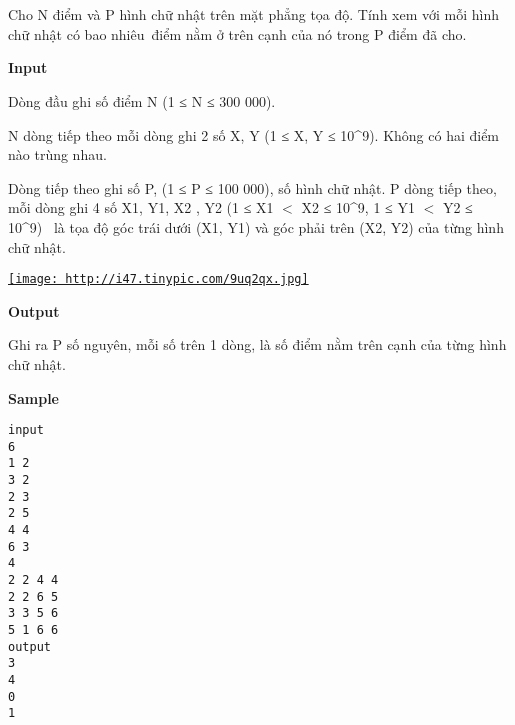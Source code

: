 

 

 

Cho N điểm và P hình chữ nhật trên mặt phẳng tọa độ. Tính xem với mỗi hình chữ nhật có bao nhiêu điểm nằm ở trên cạnh của nó trong P điểm đã cho.

\textbf{Input}

Dòng đầu ghi số điểm N (1 ≤ N ≤ 300 000).

N dòng tiếp theo mỗi dòng ghi 2 số X, Y (1 ≤ X, Y ≤ 10\textasciicircum9). Không có hai điểm nào trùng nhau.

Dòng tiếp theo ghi số P, (1 ≤ P ≤ 100 000), số hình chữ nhật. P dòng tiếp theo, mỗi dòng ghi 4 số X1, Y1, X2 , Y2 (1 ≤ X1 $<$ X2 ≤ 10\textasciicircum9, 1 ≤ Y1 $<$ Y2 ≤ 10\textasciicircum9)  là tọa độ góc trái dưới (X1, Y1) và góc phải trên (X2, Y2) của từng hình chữ nhật.

\href{http://tinypic.com}{
\texttt{[image: http://i47.tinypic.com/9uq2qx.jpg]}}

\textbf{Output}

Ghi ra P số nguyên, mỗi số trên 1 dòng, là số điểm nằm trên cạnh của từng hình chữ nhật.

\textbf{Sample}
\begin{verbatim}
input  
6 
1 2 
3 2 
2 3 
2 5 
4 4 
6 3 
4 
2 2 4 4 
2 2 6 5 
3 3 5 6 
5 1 6 6  
output  
3 
4 
0 
1
\end{verbatim}